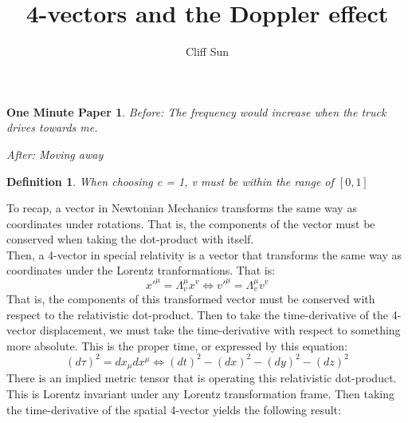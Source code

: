 \documentclass{article}
\title{4-vectors and the Doppler effect}
\author{Cliff Sun}
\newtheorem{definition}[theorem]{Definition}
\newtheorem{one minute paper}[theorem]{One Minute Paper}
\begin{document}
\maketitle

\begin{one minute paper}
    Before: The frequency would increase when the truck drives towards me. 

    After: Moving away
\end{one minute paper}

\begin{definition}
    When choosing c = 1, v must be within the range of $[0, 1]$
\end{definition}

To recap, a vector in Newtonian Mechanics transforms the same way as coordinates under rotations. That is, the components of the vector must be conserved when taking the dot-product with itself. \\

Then, a 4-vector in special relativity is a vector that transforms the same way as coordinates under the Lorentz tranformations.
That is:
\begin{equation}
    x'^\mu = \Lambda^\mu_v x^v \iff v'^\mu = \Lambda^\mu_v v^v 
\end{equation}
That is, the components of this transformed vector must be conserved with respect to the relativistic dot-product. 
Then to take the time-derivative of the 4-vector displacement, we must take the time-derivative with respect to something more absolute. This is the proper time, or 
expressed by this equation:
\begin{equation}
    (d\tau)^2 = dx_\mu dx^\mu \iff (dt)^2 - (dx)^2 - (dy)^2 - (dz)^2
\end{equation}
There is an implied metric tensor that is operating this relativistic dot-product. This is Lorentz invariant under any Lorentz transformation frame. 
Then taking the time-derivative of the spatial 4-vector yields the following result:
\end{document}
